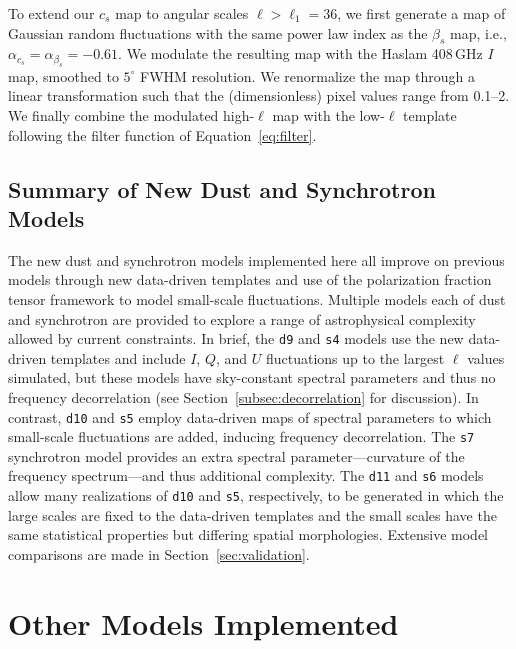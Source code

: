 \documentclass[twocolumn]{aastex631}
\begin{document}
To extend our $c_s$ map to angular scales $\ell > \ell_1 = 36$, we first generate a map of Gaussian random fluctuations with the same power law index as the $\beta_s$ map, i.e., $\alpha _{c_s}=\alpha _{\beta_s} = -0.61$. We modulate the resulting map with the Haslam 408\,GHz $I$ map, smoothed to $5^\circ$ FWHM resolution. We renormalize the map through a linear transformation such that the (dimensionless) pixel values range from 0.1--2. We finally combine the modulated high-$\ell$ map with the low-$\ell$ template following the filter function of Equation~\ref{eq:filter}.

\subsection{Summary of New Dust and Synchrotron Models}

The new dust and synchrotron models implemented here all improve on previous models through new data-driven templates and use of the polarization fraction tensor framework to model small-scale fluctuations. Multiple models each of dust and synchrotron are provided to explore a range of astrophysical complexity allowed by current constraints. In brief, the \texttt{d9} and \texttt{s4} models use the new data-driven templates and include $I$, $Q$, and $U$ fluctuations up to the largest $\ell$ values simulated, but these models have sky-constant spectral parameters and thus no frequency decorrelation (see Section~\ref{subsec:decorrelation} for discussion). In contrast, \texttt{d10} and \texttt{s5} employ data-driven maps of spectral parameters to which small-scale fluctuations are added, inducing frequency decorrelation. The \texttt{s7} synchrotron model provides an extra spectral parameter---curvature of the frequency spectrum---and thus additional complexity. The \texttt{d11} and \texttt{s6} models allow many realizations of \texttt{d10} and \texttt{s5}, respectively, to be generated in which the large scales are fixed to the data-driven templates and the small scales have the same statistical properties but differing spatial morphologies. Extensive model comparisons are made in Section~\ref{sec:validation}.

\section{Other Models Implemented} \label{sec:other_models}
\end{document}
